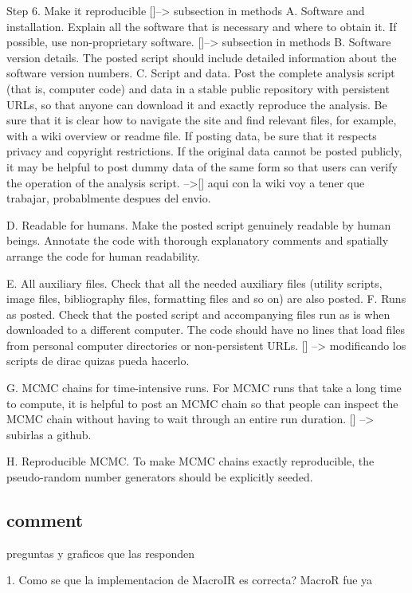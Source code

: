 \documentclass[a4paper,12pt]{article}
\begin{document}
		Step 6. Make it reproducible []--> subsection in methods
		A. Software and installation. Explain all the software that is necessary and where to obtain it. If possible, use non-proprietary software. []--> subsection in methods
		B. Software version details. The posted script should include detailed information about the software version numbers.
		C. Script and data. Post the complete analysis script (that is, computer code) and data in a stable public repository with persistent URLs, so that anyone can download it and exactly reproduce the analysis. Be sure that it is clear how to navigate the site and find relevant files, for example, with a wiki overview or readme file. If posting data, be sure that it respects privacy and copyright restrictions. If the original data cannot be posted publicly, it may be helpful to post dummy data of the same form so that users can verify the operation of the analysis script.  -->[] aqui con la wiki voy a tener que trabajar, probablmente despues del envio. 
		
		D. Readable for humans. Make the posted script genuinely readable by human beings. Annotate the code with thorough explanatory comments and spatially arrange the code for human
		readability.
		
		E. All auxiliary files. Check that all the needed auxiliary files (utility scripts, image files, bibliography files, formatting files and so on) are also posted.
		F. Runs as posted. Check that the posted script and accompanying files run as is when downloaded to a different computer. The code should have no lines that load files from personal
		computer directories or non-persistent URLs. [] --> modificando los scripts de dirac quizas pueda hacerlo. 
		
		G. MCMC chains for time-intensive runs. For MCMC runs that take a long time to compute, it is helpful to post an MCMC chain so that people can inspect the MCMC chain without having to
		wait through an entire run duration. [] --> subirlas a github. 
		
		H. Reproducible MCMC. To make MCMC chains exactly reproducible, the pseudo-random number generators should be explicitly seeded.
	
	
	\subsection{comment}
		preguntas y graficos que las responden
		
		1. Como se que la implementacion de MacroIR es correcta?
		MacroR fue ya 
		
\end{document}
